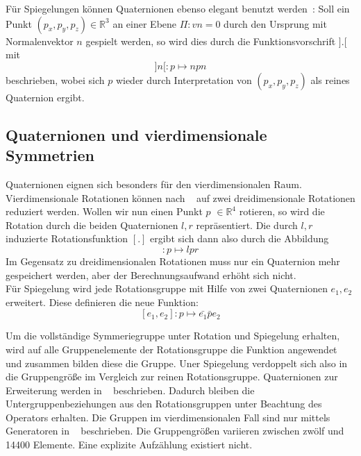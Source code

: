 \noindent Für Spiegelungen können Quaternionen ebenso elegant benutzt werden~\cite{1946}: Soll ein Punkt  $(p_x, p_y, p_z) \in \mathbb{R}^3$
an einer Ebene $\Pi: vn = 0$ durch den Ursprung mit Normalenvektor $n$ gespielt werden, so wird dies durch die Funktionsvorschrift $].[$ mit
\begin{equation*}
]n[: p \mapsto n p n
\end{equation*}
beschrieben, wobei sich $p$ wieder durch Interpretation von $(p_x, p_y, p_z)$ als reines Quaternion ergibt.

\subsection{Quaternionen und vierdimensionale Symmetrien}
Quaternionen eignen sich besonders für den vierdimensionalen Raum. Vierdimensionale Rotationen können nach ~\cite{conway2003} auf zwei dreidimensionale Rotationen reduziert werden.
\noindent Wollen wir nun einen Punkt $p$ $\in \mathbb{R}^4$ rotieren, so wird die Rotation durch die beiden Quaternionen $l,r$ repräsentiert.
Die durch $l,r$ induzierte Rotationsfunktion $[.]$ ergibt sich dann also durch die Abbildung
\begin{equation*}
[l,r]: p \mapsto l p r
\end{equation*}
Im Gegensatz zu dreidimensionalen Rotationen muss nur ein Quaternion mehr gespeichert werden,  aber der Berechnungsaufwand erhöht sich nicht.\\
 Für Spiegelung wird jede Rotationsgruppe mit Hilfe von zwei Quaternionen $e_1,e_2$ erweitert. Diese definieren die neue Funktion:
\begin{equation*}\label{eq:reflect4D}
	[e_1,e_2]: p \mapsto \bar{e_1} \bar{p} e_2
\end{equation*}

Um die vollständige Symmeriegruppe unter Rotation und Spiegelung erhalten, wird auf alle Gruppenelemente der Rotationsgruppe die Funktion angewendet und zusammen bilden diese die Gruppe. Uner Spiegelung verdoppelt sich also in die Gruppengröße im Vergleich zur reinen Rotationsgruppe.  Quaternionen zur Erweiterung werden in  ~\cite{conway2003} beschrieben. Dadurch bleiben die Untergruppenbeziehungen aus den Rotationsgruppen unter Beachtung des Operators erhalten.
Die Gruppen im vierdimensionalen Fall sind nur mittels Generatoren in ~\cite{conway2003} beschrieben. Die Gruppengrößen variieren zwischen zwölf und 14400 Elemente. Eine explizite Aufzählung existiert nicht. 

